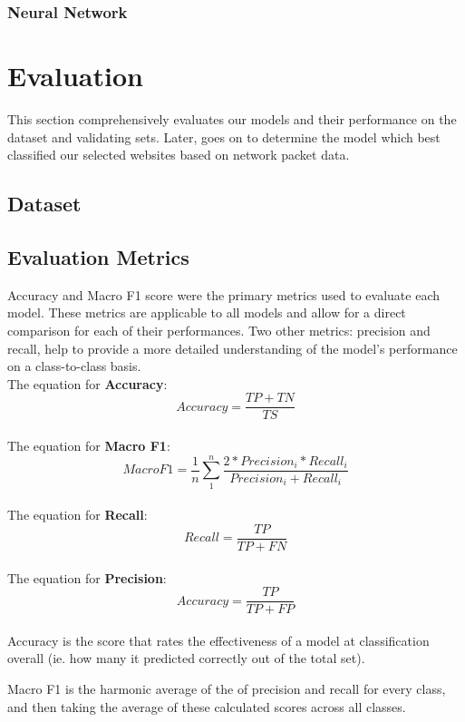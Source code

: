 \documentclass[10pt,sigconf,letterpaper,nonacm]{acmart}
\begin{document}
\subsubsection{Neural Network}
\section{Evaluation}
This section comprehensively evaluates our models and their performance on the dataset and validating sets. Later, goes on to determine the model which best classified our selected websites based on network packet data.
\subsection{Dataset}
\subsection{Evaluation Metrics}
Accuracy and Macro F1 score were the primary metrics used to evaluate each model. These metrics are applicable to all models and allow for
a direct comparison for each of their performances. Two other metrics: precision and recall, help to provide a more detailed understanding of the model's performance on a class-to-class basis.
\newline \\
The equation for \textbf{Accuracy}: \\
\[
Accuracy= \frac{TP + TN}{TS}
\]
\newline \\
The equation for \textbf{Macro F1}: \\
\[
Macro F 1= \frac{1}{n} \sum_{1}^{n} \frac{2*Precision_i*Recall_i}{Precision_i+Recall_i}
\]
\newline \\
The equation for \textbf{Recall}: \\
\[
Recall= \frac{TP}{TP + FN}
\]
\newline \\
The equation for \textbf{Precision}: \\
\[
Accuracy= \frac{TP}{TP + FP}
\]
\\
Accuracy is the score that rates the effectiveness of a model at classification overall (ie. how many it predicted correctly out of the total set). 

Macro F1 is the harmonic average of the of precision and recall for every class, and then taking the average of these calculated scores across all classes.
\end{document}
